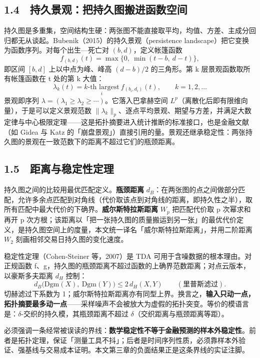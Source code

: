 \documentclass[12pt,a4paper]{ctexart}
\begin{document}
\subsection{1.4　持久景观：把持久图搬进函数空间}
持久图是多重集，空间结构生硬：两张图不能直接取平均，均值、方差、主成分回归都无从谈起。Bubenik（2015）的持久景观（persistence landscape）把它变换为函数序列。对每个出生—死亡对 \((b, d)\)，定义帐篷函数
\[
f_{(b,d)}(t) = \max\{0,\ \min(t - b,\ d - t)\},
\]
即区间 \([b, d]\) 上以中点为峰、峰高 \((d - b)/2\) 的三角形。第 k 层景观函数取所有帐篷函数在 t 处的第 k 大值：
\[
\lambda_k(t) = \underset{i}{k\text{-th largest}}\ f_{(b_i, d_i)}(t),\qquad k = 1, 2, \ldots
\]
景观即序列 \(\lambda = (\lambda_1 \ge \lambda_2 \ge \cdots)\)。它落入巴拿赫空间 \(L^p\)（离散化后即有限维向量），于是可以定义景观范数 \(\|\lambda_k\|_p\)、逐点平均景观、期望与方差，并满足大数定律与中心极限定理——这是拓扑摘要进入统计推断的标准接口，也是金融文献（如 Gidea 与 Katz 的「崩盘景观」）直接引用的量。景观还继承稳定性：两张持久图的景观在一致范数下的距离不超过它们的瓶颈距离。\par
\subsection{1.5　距离与稳定性定理}
持久图之间的比较用最优匹配定义。\textbf{瓶颈距离} \(d_B\)：在两张图的点之间做部分匹配，允许多余点匹配到对角线（代价取该点到对角线的距离，即持久性之半），取所有匹配中最大代价的下确界。\textbf{威尔斯特拉斯距离} \(W_p\) 把匹配代价取 p 次幂求和再开 p 次方根；该距离以「把一张持久图的质量搬运到另一张」的最优代价定义，是持久图空间上的度量，本文统一译名「威尔斯特拉斯距离」，并用二阶距离 \(W_2\) 刻画相邻交易日持久图的变化速度。\par
稳定性定理（Cohen-Steiner 等，2007）是 TDA 可用于含噪数据的根本理由。对正规函数 f、g，持久图的瓶颈距离不超过函数的上确界范数距离；对点云版本，以豪斯多夫距离 \(d_H\) 控制：
\[
d_B\big(\mathrm{Dgm}(X),\ \mathrm{Dgm}(Y)\big) \le 2\, d_H(X, Y)\qquad(\text{里普斯滤过}).
\]
切赫滤过下系数为 1；威尔斯特拉斯距离亦有同型上界。换言之，\textbf{输入只动一点，拓扑摘要最多动一点}——采样噪声不会被放大为虚假的拓扑突变。等价的模语言是：\(\delta\)-交织的持久模，其瓶颈距离不超过 \(\delta\)（交织距离与瓶颈距离等距）。\par
必须强调一条经常被误读的界线：\textbf{数学稳定性不等于金融预测的样本外稳定性}。前者是拓扑定理，保证「测量工具不抖」；后者是时间序列性质，必须靠样本外验证、强基线与交易成本证明。本文第三章的负面结果正是这条界线的实证注脚。\par
\end{document}
